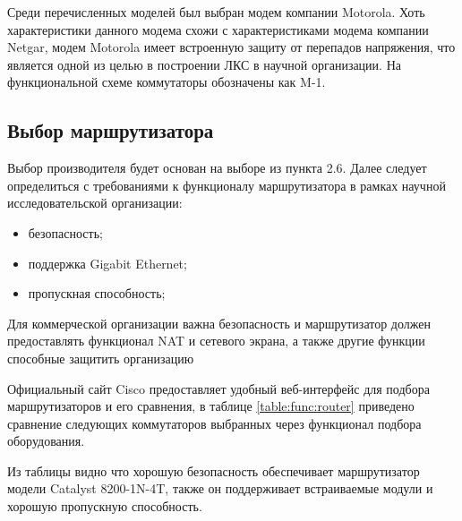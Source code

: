 Среди перечисленных моделей был выбран модем компании Motorola. Хоть характеристики данного модема схожи с характеристиками модема компании Netgar,
модем Motorola имеет встроенную защиту от перепадов напряжения\cite{motorola}, что является одной из целью в построении ЛКС в научной организации. 
На функциональной схеме коммутаторы обозначены как M-1.

\subsection{Выбор маршрутизатора}

Выбор производителя будет основан на выборе из пункта 2.6. 
Далее следует определиться с требованиями к функционалу маршрутизатора 
в рамках научной исследовательской организации:

\begin{itemize}
    \item безопасность;
    \item поддержка Gigabit Ethernet;
    \item пропускная способность;
\end{itemize}

Для коммерческой организации важна безопасность и маршрутизатор должен предоставлять функционал NAT и сетевого экрана, а также другие функции способные защитить организацию

Официальный сайт Cisco предоставляет удобный веб-интерфейс для подбора маршрутизаторов\cite{ciscorouter} и его сравнения, в таблице \ref{table:func:router} приведено сравнение следующих коммутаторов 
выбранных через функционал подбора оборудования.

Из таблицы видно что хорошую безопасность обеспечивает маршрутизатор модели Catalyst 8200-1N-4T, также он поддерживает встраиваемые модули и хорошую пропускную способность.

